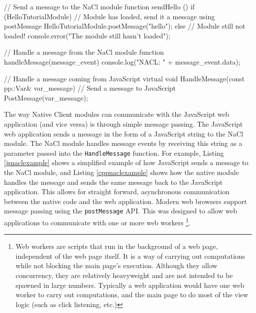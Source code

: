 \begin{code}
// Send a message to the NaCl module
function sendHello () {
  if (HelloTutorialModule) {
    // Module has loaded, send it a message using postMessage
    HelloTutorialModule.postMessage("hello");
  } else {
    // Module still not loaded!
    console.error("The module still hasn't loaded");
  }
}

// Handle a message from the NaCl module
function handleMessage(message_event) {
  console.log("NACL: " + message_event.data);
}
\end{code}


\begin{code}
// Handle a message coming from JavaScript
virtual void HandleMessage(const pp::Var& var_message) {
  // Send a message to JavaScript
  PostMessage(var_message);
}
\end{code}

The way Native Client modules can communicate with the JavaScript web application (and vice versa) is through simple message passing. The JavaScript web application sends a message in the form of a JavaScript string to the NaCl module. The NaCl module handles message events by receiving this string as a parameter passed into the \lstinline+HandleMessage+ function. For example, Listing \ref{jsnaclexample} shows a simplified example of how JavaScript sends a message to the NaCl module, and Listing \ref{cppnaclexample} shows how the native module handles the message and sends the same message back to the JavaScript application. This allows for straight forward, asynchronous communication between the native code and the web application. Modern web browsers support message passing using the \lstinline+postMessage+ API. This was designed to allow web applications to communicate with one or more web workers
\footnote{Web workers \cite{webworkersw3c} are scripts that run in the background of a web page, independent of the web page itself. It is a way of carrying out computations while not blocking the main page's execution. Although they allow concurrency, they are relatively heavyweight and are not intended to be spawned in large numbers. Typically a web application would have one web worker to carry out computations, and the main page to do most of the view logic (such as click listening, etc.)}. 

